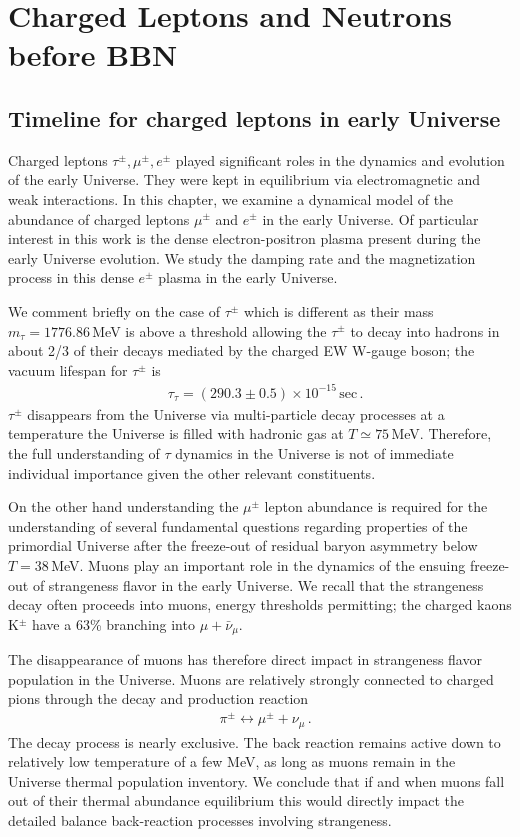 \section{Charged Leptons and Neutrons before BBN} 
\subsection{Timeline for charged leptons in early Universe}\label{Electron}
Charged leptons $\tau^\pm,\mu^\pm,e^\pm$ played significant roles in the dynamics and evolution of the early Universe. They were kept in equilibrium via electromagnetic and weak interactions.  In this chapter, we examine a dynamical model of the abundance of charged leptons $\mu^\pm$ and $e^\pm$ in the early Universe.  Of particular interest in this work is the dense electron-positron plasma present during the early Universe evolution. We study the damping rate and the magnetization process in this dense $e^\pm$ plasma in the early Universe.

We comment briefly on the case of $\tau^\pm$ which is different as their mass $m_\tau=1776.86$\,MeV is above a threshold allowing the $\tau^\pm$ to decay into hadrons in about 2/3 of their decays mediated by the charged EW  W-gauge boson; the vacuum lifespan for $\tau^\pm$ is~\cite{ParticleDataGroup:2022pth}
\begin{align}
&\tau_{\tau}=(290.3\pm0.5)\times10^{-15}\,\mathrm{sec}\,.
\end{align}
$\tau^\pm$ disappears from the Universe via multi-particle decay processes at a temperature the Universe is filled with hadronic gas at $T\simeq 75$\,MeV. Therefore, the full understanding of $\tau$ dynamics in the Universe is not of immediate individual importance given the other relevant constituents.

On the other hand understanding the $\mu^\pm$ lepton abundance is required for the understanding of several fundamental questions regarding properties of the primordial Universe after the freeze-out of residual baryon asymmetry below $T=38$\,MeV. Muons play an important role in the dynamics of the ensuing freeze-out of strangeness flavor in the early Universe. We recall that the strangeness decay often proceeds into muons, energy thresholds permitting;  the charged kaons K$^\pm$ have a 63\% branching into $\mu+\bar \nu_\mu$. 

The disappearance of muons has therefore direct impact in strangeness flavor population in the Universe. Muons are relatively strongly connected to charged pions through the decay and production reaction 
\begin{align}
&\pi^\pm\leftrightarrow \mu^\pm+\nu_\mu\,.
\end{align}
The decay process is nearly exclusive. The back reaction remains active down to relatively low temperature of a few MeV, as long as muons remain in the Universe thermal population inventory.  We conclude that if and when  muons fall out of their thermal abundance equilibrium this would directly impact the detailed balance back-reaction processes involving strangeness.  

